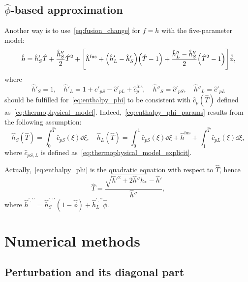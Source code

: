 \documentclass{article}
\newcommand{\fusion}[1]{{#1}^\mathrm{fus}}
\newcommand{\Hh}{\hat{h}}
\newcommand{\HT}{\hat{T}}
\newcommand{\Hc}{\hat{c}}
\newcommand{\Hphi}{\hat{\phi}}
\begin{document}
\subsection{\(\hat\phi\)-based approximation}

Another way is to use~\eqref{eq:fusion_change} for \(f=h\) with the five-parameter model:
\begin{equation}\label{eq:enthalpy_phi}
	\Hh = \Hh'_S\HT + \frac{\Hh''_S}2\HT^2 + \qty[
	    \fusion{\Hh} + \qty(\Hh'_L-\Hh'_S) \qty(\HT-1) + \frac{\Hh''_L-\Hh''_S}2 \qty( \HT^2-1 )
	]\Hphi,
\end{equation}
where
\begin{equation}\label{eq:enthalpy_phi_params}
	\Hh'_S = 1, \quad \Hh'_L = 1 + \Hc'_{pS} - \Hc'_{pL} + \fusion{\Hc}_p, \quad
	\Hh''_S = \Hc'_{pS}, \quad \Hh''_L = \Hc'_{pL}
\end{equation}
should be fulfilled for~\eqref{eq:enthalpy_phi} to be consistent with \(\Hc_p(\HT)\)
defined as~\eqref{eq:thermophysical_model}.
Indeed,~\eqref{eq:enthalpy_phi_params} results from the following assumption:
\begin{equation}\label{eq:enthalpy_phi_explicit}
	\Hh_S(\HT) = \int_0^{\HT} \Hc_{pS}(\xi)\dd{\xi}, \quad
	\Hh_L(\HT) = \int_0^1 \Hc_{pS}(\xi)\dd{\xi} + \fusion{\Hh} + \int_1^{\HT} \Hc_{pL}(\xi)\dd{\xi},
\end{equation}
where \(\Hc_{pS,L}\) is defined as~\eqref{eq:thermophysical_model_explicit}.

Actually,~\eqref{eq:enthalpy_phi} is the quadratic equation with respect to \(\HT\), hence
\begin{equation}\label{eq:temp_phi}
	\HT = \frac{\sqrt{\Hh'^2 + 2\Hh''\Hh_*}-\Hh'}{\Hh''},
\end{equation}
where \(\Hh^{\prime,\prime\prime} = \Hh_S^{\prime,\prime\prime} (1-\hat\phi) + \Hh_L^{\prime,\prime\prime}\hat\phi\).

\section{Numerical methods}

\subsection{Perturbation and its diagonal part}
\end{document}
